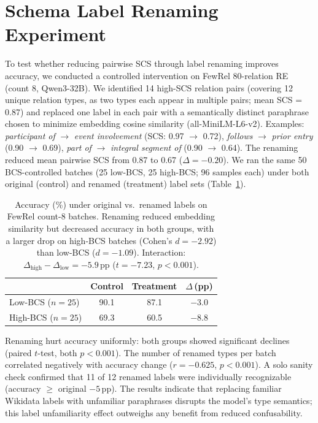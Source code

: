\documentclass[11pt]{article}
\begin{document}
\section{Schema Label Renaming Experiment}
\label{app:renaming}

To test whether reducing pairwise SCS through label renaming improves accuracy, we conducted a controlled intervention on FewRel 80-relation RE (count 8, Qwen3-32B). We identified 14 high-SCS relation pairs (covering 12 unique relation types, as two types each appear in multiple pairs; mean SCS = 0.87) and replaced one label in each pair with a semantically distinct paraphrase chosen to minimize embedding cosine similarity (all-MiniLM-L6-v2). Examples: \textit{participant of} $\to$ \textit{event involvement} (SCS: 0.97 $\to$ 0.72), \textit{follows} $\to$ \textit{prior entry} (0.90 $\to$ 0.69), \textit{part of} $\to$ \textit{integral segment of} (0.90 $\to$ 0.64). The renaming reduced mean pairwise SCS from 0.87 to 0.67 ($\Delta = -0.20$). We ran the same 50 BCS-controlled batches (25 low-BCS, 25 high-BCS; 96 samples each) under both original (control) and renamed (treatment) label sets (Table~\ref{tab:renaming}).

\begin{table}[h!]
\centering
\small
\caption{Accuracy (\%) under original vs.\ renamed labels on FewRel count-8 batches. Renaming reduced embedding similarity but decreased accuracy in both groups, with a larger drop on high-BCS batches (Cohen's $d = -2.92$) than low-BCS ($d = -1.09$). Interaction: $\Delta_{\text{high}} - \Delta_{\text{low}} = -5.9$\,pp ($t = -7.23$, $p < 0.001$).}
\label{tab:renaming}
\begin{tabular}{lccc}
\toprule
& \textbf{Control} & \textbf{Treatment} & \textbf{$\Delta$\,(pp)} \\
\midrule
Low-BCS ($n=25$)  & 90.1 & 87.1 & $-$3.0 \\
High-BCS ($n=25$) & 69.3 & 60.5 & $-$8.8 \\
\bottomrule
\end{tabular}
\end{table}

Renaming hurt accuracy uniformly: both groups showed significant declines (paired $t$-test, both $p < 0.001$). The number of renamed types per batch correlated negatively with accuracy change ($r = -0.625$, $p < 0.001$). A solo sanity check confirmed that 11 of 12 renamed labels were individually recognizable (accuracy $\geq$ original $-5$\,pp). The results indicate that replacing familiar Wikidata labels with unfamiliar paraphrases disrupts the model's type semantics; this label unfamiliarity effect outweighs any benefit from reduced confusability.
\end{document}
